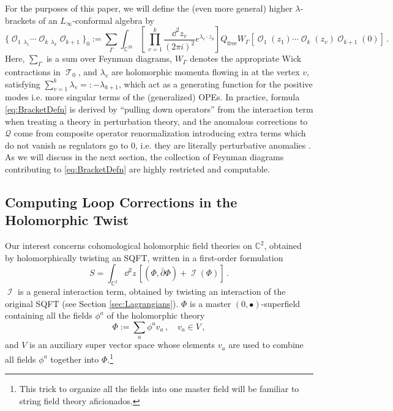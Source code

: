 \documentclass[11pt]{article}
\DeclareMathOperator{\calI}{\mathcal{I}}
\DeclareMathOperator{\calO}{\mathcal{O}}
\DeclareMathOperator{\calT}{\mathcal{T}}
\def\bbC{\mathbb{C}}
\renewcommand{\bm}{\mathcal}
\begin{document}
For the purposes of this paper, we will define the (even more general) higher $\lambda$-brackets of an $L_\infty$-conformal algebra by
\begin{equation}\label{eq:BracketDefn}
    \{\calO_1 {}_{\lambda_1} \cdots \calO_k {}_{\lambda_k} \calO_{k+1}\}_0
        := \sum_{\Gamma} \int_{\bbC^{2k}} \!\!\left[\,\prod_{v=1}^k \frac{\dd^2 z_v}{(2\pi i)^{2}} e^{\lambda_v \cdot z_k}\right] Q_{\text{free}} W_\Gamma[\calO_1(z_1)\cdots \calO_k(z_v)\!\calO_{k+1}(0)]\,.
\end{equation}
Here, $\sum_{\Gamma}$ is a sum over Feynman diagrams, $W_{\Gamma}$ denotes the appropriate Wick contractions in $\calT_0$, and  $\lambda_v$ are holomorphic momenta flowing in at the vertex $v$, satisfying $\sum_{v=1}^k \lambda_v =: -\lambda_{k+1}$, which act as a generating function for the positive modes i.e. more singular terms of the (generalized) OPEs. In practice, formula \eqref{eq:BracketDefn} is derived by ``pulling down operators'' from the interaction term when treating a theory in perturbation theory, and the anomalous corrections to $\bm{Q}$ come from composite operator renormalization introducing extra terms which do not vanish as regulators go to $0$, i.e. they are literally perturbative anomalies \cite{Gaiotto:2024gii}. As we will discuss in the next section, the collection of Feynman diagrams contributing to \eqref{eq:BracketDefn} are highly restricted and computable.


\subsection{Computing Loop Corrections in the Holomorphic Twist}\label{sec:ComputingLoopCorrections}
Our interest concerns cohomological holomorphic field theories on $\bbC^2$, obtained by holomorphically twisting an SQFT, written in a first-order formulation
\begin{equation}\label{eq:FirstOrderAction}
    S = \int_{\bbC^2} \dd^2 z\, \left[(\Phi, \bar{\partial} \Phi) + \calI(\Phi)\right]\,.
\end{equation}
$\calI$ is a general interaction term, obtained by twisting an interaction of the original SQFT (see Section \ref{sec:Lagrangians}). $\Phi$ is a master $(0,\bullet)$-superfield containing all the fields $\phi^a$ of the holomorphic theory
\begin{equation}
    \Phi := \sum_{a} \phi^a v_a\,,\quad v_a \in V\,,
\end{equation}
and $V$ is an auxiliary super vector space whose elements $v_a$ are used to combine all fields $\phi^a$ together into $\Phi$.\footnote{This trick to organize all the fields into one master field will be familiar to string field theory aficionados.}
\end{document}
